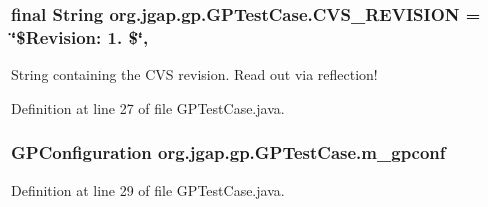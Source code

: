 \hypertarget{classorg_1_1jgap_1_1gp_1_1_g_p_test_case_ac95afe493701e26eee1fc31d6b4b5406}{
\subsubsection[{C\-V\-S\-\_\-\-R\-E\-V\-I\-S\-I\-O\-N}]{\setlength{\rightskip}{0pt plus 5cm}final String org.\-jgap.\-gp.\-G\-P\-Test\-Case.\-C\-V\-S\-\_\-\-R\-E\-V\-I\-S\-I\-O\-N = \char`\"{}\$Revision\-: 1. \$\char`\"{}\hspace{0.3cm}{\ttfamily [static]}, {\ttfamily [private]}}}\label{classorg_1_1jgap_1_1gp_1_1_g_p_test_case_ac95afe493701e26eee1fc31d6b4b5406}
String containing the C\-V\-S revision. Read out via reflection! 

Definition at line 27 of file G\-P\-Test\-Case.\-java.

\hypertarget{classorg_1_1jgap_1_1gp_1_1_g_p_test_case_a5c64d356cfbd17b5f87d789091061185}{
\subsubsection[{m\-\_\-gpconf}]{\setlength{\rightskip}{0pt plus 5cm}G\-P\-Configuration org.\-jgap.\-gp.\-G\-P\-Test\-Case.\-m\-\_\-gpconf\hspace{0.3cm}{\ttfamily [protected]}}}\label{classorg_1_1jgap_1_1gp_1_1_g_p_test_case_a5c64d356cfbd17b5f87d789091061185}


Definition at line 29 of file G\-P\-Test\-Case.\-java.




